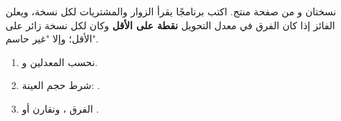 \begin{statement}
نسختان  و من صفحة منتج. اكتب برنامجًا يقرأ الزوار والمشتريات لكل نسخة، ويعلن الفائز إذا كان الفرق في معدل التحويل \textbf{ نقطة على الأقل} وكان لكل نسخة  زائر على الأقل؛ وإلا "غير حاسم".
\end{statement}
\begin{stepsbox}\begin{enumerate}
\item نحسب المعدلين  و.
\item شرط حجم العينة: .
\item الفرق ، ونقارن  أو .
\end{enumerate}\end{stepsbox}
